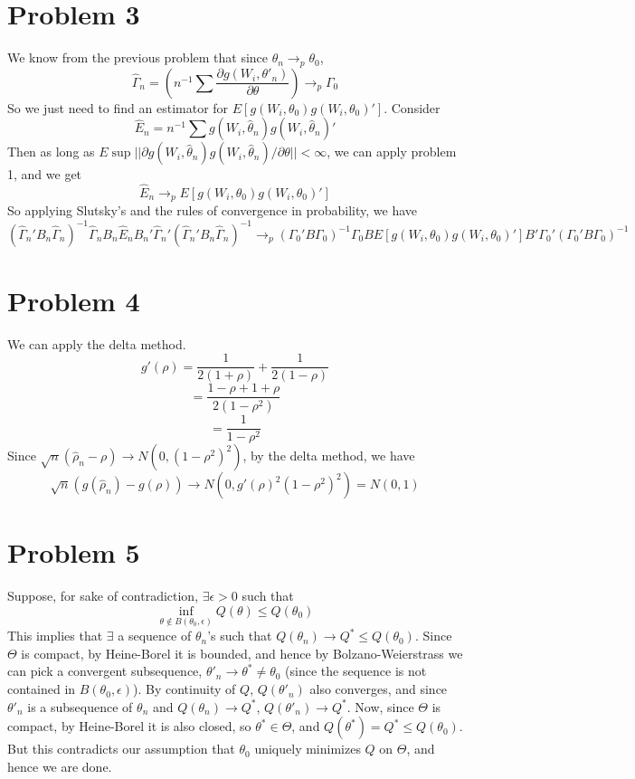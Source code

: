 \documentclass[10pt,letter]{article}
\begin{document}
\section*{Problem 3}
We know from the previous problem that since $\hat{\theta}_n \to_p \theta_0$,
\[ \hat{\Gamma}_n = \left( n^{-1} \sum \frac{\partial g(W_i, \theta'_{n})}{\partial \theta} \right)  \to_p \Gamma_0 \]
So we just need to find an estimator for $E[g(W_i, \theta_0)g(W_i, \theta_0)']$. Consider
\[ \hat{E}_n = n^{-1} \sum g(W_i, \hat{\theta}_n)g(W_i, \hat{\theta}_n)' \]
Then as long as $E\sup||\partial g(W_i, \hat{\theta}_n)g(W_i, \hat{\theta}_n)/\partial \theta|| < \infty$, we can apply problem 1, and we get
\[ \hat{E}_n \to_p E[g(W_i, \theta_0)g(W_i, \theta_0)'] \]
So applying Slutsky's and the rules of convergence in probability, we have
\[ (\hat{\Gamma}_n'B_n\hat{\Gamma}_n)^{-1} \hat{\Gamma}_n B_n \hat{E}_n B_n' \hat{\Gamma}_n' (\hat{\Gamma}_n'B_n\hat{\Gamma}_n)^{-1} \to_p (\Gamma_0'B\Gamma_0)^{-1} \Gamma_0 B E[g(W_i, \theta_0)g(W_i, \theta_0)']B' \Gamma_0' (\Gamma_0'B\Gamma_0)^{-1}\] 
\section*{Problem 4}
We can apply the delta method.
\[ g'(\rho) = \frac{1}{2(1+\rho)} + \frac{1}{2(1-\rho)} \]
\[ = \frac{1-\rho + 1+\rho}{2(1-\rho^2)} \]
\[ = \frac{1}{1-\rho^2} \]
Since $\sqrt{n} (\hat{\rho}_n - \rho) \to N(0, (1-\rho^2)^2)$, by the delta method, we have
\[\sqrt{n} (g(\hat{\rho}_n) - g(\rho)) \to N(0, g'(\rho)^2(1-\rho^2)^2) = N(0,1)  \]
\section*{Problem 5}
Suppose, for sake of contradiction, $\exists \epsilon > 0$ such that
\[ \inf_{\theta \not \in B(\theta_0, \epsilon)}Q(\theta) \le Q(\theta_0) \]
This implies that $\exists$ a sequence of $\theta_n$'s such that $Q(\theta_n) \to Q^* \le Q(\theta_0)$. Since $\Theta$ is compact, by Heine-Borel it is bounded, and hence by Bolzano-Weierstrass we can pick a convergent subsequence, $\theta'_n \to \theta^* \neq \theta_0$ (since the sequence is not contained in $B(\theta_0, \epsilon)$). By continuity of $Q$, $Q(\theta'_n)$ also converges, and since $\theta'_n$ is a subsequence of $\theta_n$ and $Q(\theta_n) \to Q^*$, $Q(\theta'_n) \to Q^*$. Now, since $\Theta$ is compact, by Heine-Borel it is also closed, so $\theta^* \in \Theta$, and $Q(\theta^*) = Q^* \le Q(\theta_0)$. But this contradicts our assumption that $\theta_0$ uniquely minimizes $Q$ on $\Theta$, and hence we are done.
\end{document}

